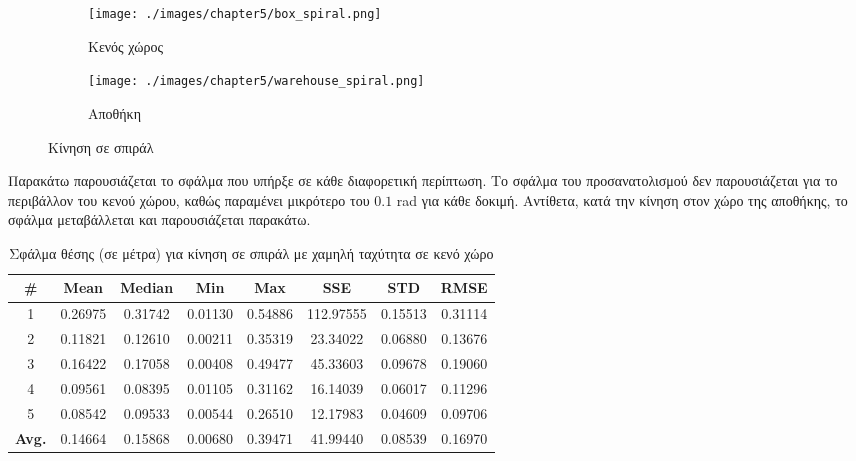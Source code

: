 \begin{figure}[!ht]
        \begin{subfigure}{0.5\textwidth}
            \texttt{[image: ./images/chapter5/box\_spiral.png]}
                \caption{Κενός χώρος}
             \label{fig:box_spiral}
        \end{subfigure}
        \begin{subfigure}{0.5\textwidth}
            \texttt{[image: ./images/chapter5/warehouse\_spiral.png]}
            \caption{Αποθήκη}
            \label{fig:warehouse_spiral}
        \end{subfigure}
        \caption{Κίνηση σε σπιράλ}
        \label{fig:spiral}
\end{figure} 

Παρακάτω παρουσιάζεται το σφάλμα που υπήρξε σε κάθε διαφορετική περίπτωση. Το σφάλμα του προσανατολισμού δεν παρουσιάζεται για το περιβάλλον του κενού χώρου, καθώς παραμένει μικρότερο του $0.1$ rad για κάθε δοκιμή. Αντίθετα, κατά την κίνηση στον χώρο της αποθήκης, το σφάλμα μεταβάλλεται και παρουσιάζεται παρακάτω.

\begin{table}[H]
    \centering
    \caption{Σφάλμα θέσης (σε μέτρα) για κίνηση σε σπιράλ με χαμηλή ταχύτητα σε κενό χώρο}
    \label{tab:position_error_spiral_slow_box}
    \begin{tabular}{| c | c | c | c | c | c | c | c | }
        \hline
        \rowcolor{Gray}
        \# & Mean & Median & Min & Max & SSE & STD & RMSE \\
        \hline
        1 & 0.26975 & 0.31742 & 0.01130 & 0.54886 & 112.97555 & 0.15513 & 0.31114 \\
        2 & 0.11821 & 0.12610 & 0.00211 & 0.35319 & 23.34022 & 0.06880 & 0.13676 \\
        3 & 0.16422 & 0.17058 & 0.00408 & 0.49477 & 45.33603 & 0.09678 & 0.19060 \\
        4 & 0.09561 & 0.08395 & 0.01105 & 0.31162 & 16.14039 & 0.06017 & 0.11296 \\
        5 & 0.08542 & 0.09533 & 0.00544 & 0.26510 & 12.17983 & 0.04609 & 0.09706 \\
        \hline
        \textbf{Avg.} & 0.14664 & 0.15868 & 0.00680 & 0.39471 & 41.99440 & 0.08539 & 0.16970 \\
        \hline
    \end{tabular}
\end{table}


